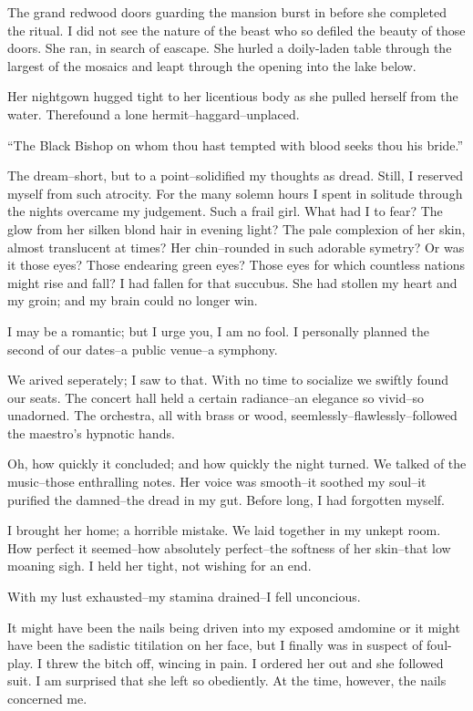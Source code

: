 \documentclass{article}
\begin{document}
\noindent %
The grand redwood doors guarding the mansion burst in
before she completed the ritual.
I did not see the nature of the beast who so defiled the
beauty of those doors.
She ran, in search of eascape.
She hurled a doily-laden table through the largest
of the mosaics and leapt through the opening
into the lake below.


Her nightgown hugged tight to her licentious body
as she pulled herself from the water.
Therefound a lone hermit--haggard--unplaced.


``The Black Bishop on whom thou hast tempted
with blood seeks thou his bride.''
\VV


\noindent
The dream--short, but to a point--solidified my thoughts as dread.
Still, I reserved myself from such atrocity.
For the many solemn hours I spent in solitude through the nights
overcame my judgement.
Such a frail girl.
What had I to fear?
The glow from her silken blond hair in evening light?
The pale complexion of her skin, almost translucent at times?
Her chin--rounded in such adorable symetry?
Or was it those eyes? Those endearing green eyes?
Those eyes for which countless nations might rise and fall?
I had fallen for that succubus.
She had stollen my heart and my groin;
and my brain could no longer win.
\VV


\noindent
I may be a romantic; but I urge you, I am no fool.
I personally planned the second of our dates--a public venue--a symphony.


We arived seperately; I saw to that.
With no time to socialize we swiftly found our seats.
The concert hall held a certain radiance--an elegance
so vivid--so unadorned.
The orchestra, all with brass or wood, seemlessly--flawlessly--followed
the maestro's hypnotic hands.


Oh, how quickly it concluded; and how quickly the night turned.
We talked of the music--those enthralling notes.
Her voice was smooth--it soothed my soul--it purified
the damned--the dread in my gut.
Before long, I had forgotten myself.


I brought her home; a horrible mistake.
We laid together in my unkept room.
How perfect it seemed--how
absolutely perfect--the
softness of her skin--that
low moaning sigh.
I held her tight, not wishing for an end.
\VV


\noindent
With my lust exhausted--my stamina drained--I fell unconcious.
\VV


\noindent
It might have been the nails being driven into my exposed amdomine
or it might have been the sadistic titilation on her face,
but I finally was in suspect of foul-play.
I threw the bitch off, wincing in pain.
I ordered her out and she followed suit.
I am surprised that she left so obediently.
At the time, however, the nails concerned me.
\end{document}
